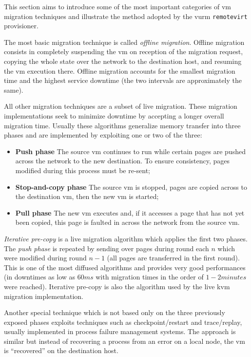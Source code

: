 This section aims to introduce some of the most important categories of \gls{vm} migration techniques and illustrate the method adopted by the \gls{vurm} \texttt{remotevirt} provisioner.

The most basic migration technique is called \emph{offline migration}. Offline migration consists in completely suspending the \gls{vm} on reception of the migration request, copying the whole state over the network to the destination host, and resuming the \gls{vm} execution there. Offline migration accounts for the smallest migration time and the highest service downtime (the two intervals are approximately the same).

All other migration techniques are a subset of live migration. These migration implementations seek to minimize downtime by accepting a longer overall migration time. Usually these algorithms generalize memory transfer into three phases \cite{clark} and are implemented by exploiting one or two of the three:

\begin{itemize}
	\item \textbf{Push phase} The source \gls{vm} continues to run while certain pages are pushed across the network to the new destination. To ensure consistency, pages modified during this process must be re-sent;
	\item \textbf{Stop-and-copy phase} The source \gls{vm} is stopped, pages are copied across to the destination \gls{vm}, then the new \gls{vm} is started;
	\item \textbf{Pull phase} The new \gls{vm} executes and, if it accesses a page that has not yet been copied, this page is faulted in across the network from the source \gls{vm}.
\end{itemize}

\emph{Iterative pre-copy} is a live migration algorithm which applies the first two phases. The \emph{push phase} is repeated by sending over pages during round each $n$ which were modified during round $n-1$ (all pages are transferred in the first round). This is one of the most diffused algorithms and provides very good performances (in \cite{clark} downtimes as low as $60ms$ with migration times in the order of $1-2 minutes$ were reached). Iterative pre-copy is also the algorithm used by the live \gls{kvm} migration implementation.

Another special technique which is not based only on the three previously exposed phases exploits techniques such as checkpoint/restart and trace/replay,  usually implemented in process failure management systems. The approach is similar but instead of recovering a process from an error on a local node, the \gls{vm} is “recovered” on the destination host.

